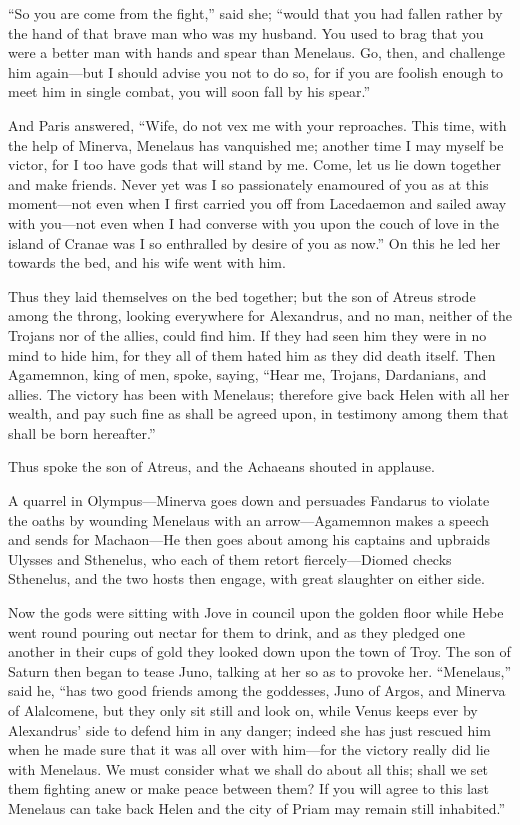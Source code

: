 “So you are come from the fight,” said she; “would that you had fallen
rather by the hand of that brave man who was my husband. You used to brag
that you were a better man with hands and spear than Menelaus. Go, then,
and challenge him again—but I should advise you not to do so, for if
you are foolish enough to meet him in single combat, you will soon fall by
his spear.”

And Paris answered, “Wife, do not vex me with your reproaches. This time,
with the help of Minerva, Menelaus has vanquished me; another time I may
myself be victor, for I too have gods that will stand by me. Come, let us
lie down together and make friends. Never yet was I so passionately
enamoured of you as at this moment—not even when I first carried you
off from Lacedaemon and sailed away with you—not even when I had
converse with you upon the couch of love in the island of Cranae was I so
enthralled by desire of you as now.” On this he led her towards the bed,
and his wife went with him.

Thus they laid themselves on the bed together; but the son of Atreus
strode among the throng, looking everywhere for Alexandrus, and no man,
neither of the Trojans nor of the allies, could find him. If they had seen
him they were in no mind to hide him, for they all of them hated him as
they did death itself. Then Agamemnon, king of men, spoke, saying, “Hear
me, Trojans, Dardanians, and allies. The victory has been with Menelaus;
therefore give back Helen with all her wealth, and pay such fine as shall
be agreed upon, in testimony among them that shall be born hereafter.”

Thus spoke the son of Atreus, and the Achaeans shouted in applause.


A quarrel in Olympus—Minerva goes down and persuades Fandarus to
violate the oaths by wounding Menelaus with an arrow—Agamemnon makes
a speech and sends for Machaon—He then goes about among his captains
and upbraids Ulysses and Sthenelus, who each of them retort fiercely—Diomed
checks Sthenelus, and the two hosts then engage, with great slaughter on
either side.

Now the gods were sitting with Jove in council upon the golden floor while
Hebe went round pouring out nectar for them to drink, and as they pledged
one another in their cups of gold they looked down upon the town of Troy.
The son of Saturn then began to tease Juno, talking at her so as to
provoke her. “Menelaus,” said he, “has two good friends among the
goddesses, Juno of Argos, and Minerva of Alalcomene, but they only sit
still and look on, while Venus keeps ever by Alexandrus’ side to defend
him in any danger; indeed she has just rescued him when he made sure that
it was all over with him—for the victory really did lie with
Menelaus. We must consider what we shall do about all this; shall we set
them fighting anew or make peace between them? If you will agree to this
last Menelaus can take back Helen and the city of Priam may remain still
inhabited.”

